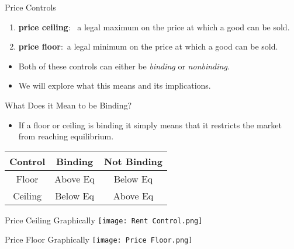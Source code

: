 \documentclass[aspectratio=169]{beamer}
\begin{document}
\begin{frame}{Price Controls}
    \begin{enumerate}
        \item<1-> \textbf{price ceiling}: ~a legal maximum on the price at which a good can be sold.
        \vspace{5mm}
        \item <3->\textbf{price floor}:~a legal minimum on the price at which a good can be sold.
    \end{enumerate}
    \vspace{5mm}
    \begin{itemize}
        \item<5-> Both of these controls can either be \textit{binding} or \textit{nonbinding}.
        \item<5-> We will explore what this means and its implications.
    \end{itemize}
\end{frame}

\begin{frame}{What Does it Mean to be Binding?}
    \begin{itemize}
        \item If a floor or ceiling is binding it simply means that it restricts the market from reaching equilibrium.
    \end{itemize}
    \begin{center}
    \begin{tabular}[c]{|c|c|c|}
        \hline
        Control & Binding & Not Binding \\
        \hline
        Floor & Above Eq & Below Eq \\
        \hline
        Ceiling & Below Eq & Above Eq \\
        \hline
   \end{tabular}
\end{center}
\end{frame}

\begin{frame}{Price Ceiling Graphically}
    \texttt{[image: Rent Control.png]}
\end{frame}

\begin{frame}{Price Floor Graphically}
    \texttt{[image: Price Floor.png]}
\end{frame}
\end{document}
